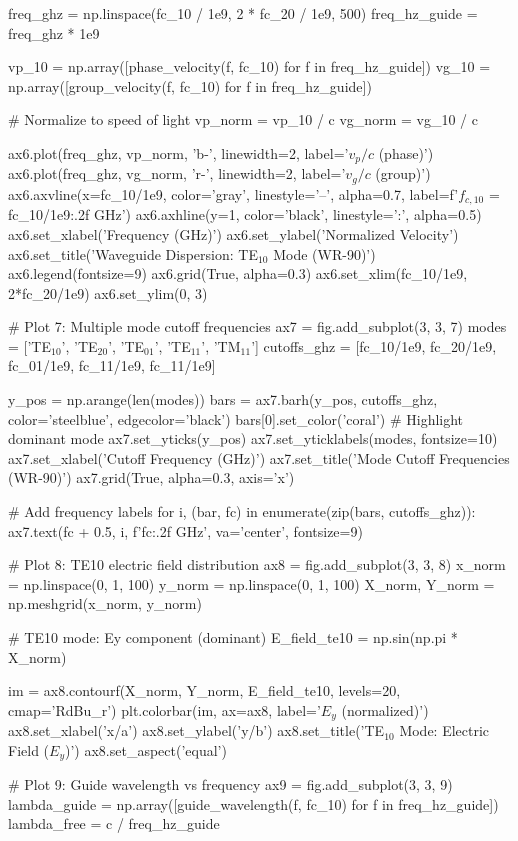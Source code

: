 \documentclass[a4paper, 11pt]{article}
\begin{document}
\begin{pycode}
freq_ghz = np.linspace(fc_10 / 1e9, 2 * fc_20 / 1e9, 500)
freq_hz_guide = freq_ghz * 1e9

vp_10 = np.array([phase_velocity(f, fc_10) for f in freq_hz_guide])
vg_10 = np.array([group_velocity(f, fc_10) for f in freq_hz_guide])

# Normalize to speed of light
vp_norm = vp_10 / c
vg_norm = vg_10 / c

ax6.plot(freq_ghz, vp_norm, 'b-', linewidth=2, label='$v_p/c$ (phase)')
ax6.plot(freq_ghz, vg_norm, 'r-', linewidth=2, label='$v_g/c$ (group)')
ax6.axvline(x=fc_10/1e9, color='gray', linestyle='--', alpha=0.7,
            label=f'$f_{{c,10}}$ = {fc_10/1e9:.2f} GHz')
ax6.axhline(y=1, color='black', linestyle=':', alpha=0.5)
ax6.set_xlabel('Frequency (GHz)')
ax6.set_ylabel('Normalized Velocity')
ax6.set_title('Waveguide Dispersion: TE$_{10}$ Mode (WR-90)')
ax6.legend(fontsize=9)
ax6.grid(True, alpha=0.3)
ax6.set_xlim(fc_10/1e9, 2*fc_20/1e9)
ax6.set_ylim(0, 3)

# Plot 7: Multiple mode cutoff frequencies
ax7 = fig.add_subplot(3, 3, 7)
modes = ['TE$_{10}$', 'TE$_{20}$', 'TE$_{01}$', 'TE$_{11}$', 'TM$_{11}$']
cutoffs_ghz = [fc_10/1e9, fc_20/1e9, fc_01/1e9, fc_11/1e9, fc_11/1e9]

y_pos = np.arange(len(modes))
bars = ax7.barh(y_pos, cutoffs_ghz, color='steelblue', edgecolor='black')
bars[0].set_color('coral')  # Highlight dominant mode
ax7.set_yticks(y_pos)
ax7.set_yticklabels(modes, fontsize=10)
ax7.set_xlabel('Cutoff Frequency (GHz)')
ax7.set_title('Mode Cutoff Frequencies (WR-90)')
ax7.grid(True, alpha=0.3, axis='x')

# Add frequency labels
for i, (bar, fc) in enumerate(zip(bars, cutoffs_ghz)):
    ax7.text(fc + 0.5, i, f'{fc:.2f} GHz', va='center', fontsize=9)

# Plot 8: TE10 electric field distribution
ax8 = fig.add_subplot(3, 3, 8)
x_norm = np.linspace(0, 1, 100)
y_norm = np.linspace(0, 1, 100)
X_norm, Y_norm = np.meshgrid(x_norm, y_norm)

# TE10 mode: Ey component (dominant)
E_field_te10 = np.sin(np.pi * X_norm)

im = ax8.contourf(X_norm, Y_norm, E_field_te10, levels=20, cmap='RdBu_r')
plt.colorbar(im, ax=ax8, label='$E_y$ (normalized)')
ax8.set_xlabel('x/a')
ax8.set_ylabel('y/b')
ax8.set_title('TE$_{10}$ Mode: Electric Field ($E_y$)')
ax8.set_aspect('equal')

# Plot 9: Guide wavelength vs frequency
ax9 = fig.add_subplot(3, 3, 9)
lambda_guide = np.array([guide_wavelength(f, fc_10) for f in freq_hz_guide])
lambda_free = c / freq_hz_guide


\end{pycode}
\end{document}

